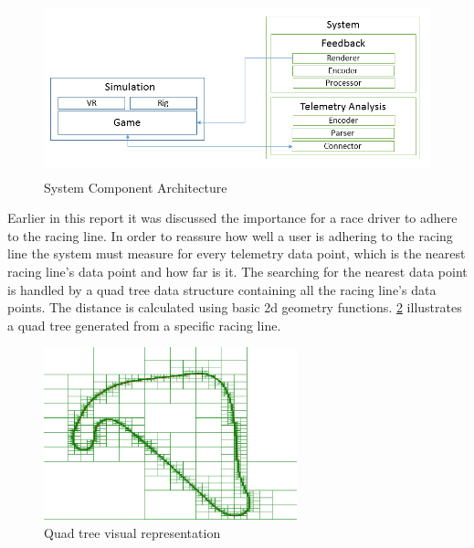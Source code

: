\documentclass{article}
\begin{document}
\begin{figure}[!htb]
	\centering
	\includegraphics[height=5cm]{SystemArc}
	\caption{System Component Architecture}
	\label{fig:SystemComponentArchitecture}
\end{figure}

Earlier in this report it was discussed the importance for a race driver to adhere to the racing line. In order to reassure how well a user is adhering to the racing line the system must measure for every telemetry data point, which is the nearest racing line's data point and how far is it. The searching for the nearest data point is handled by a quad tree data structure containing all the racing line's data points. The distance is calculated using basic 2d geometry functions. \ref{fig:QuadTree} illustrates a quad tree generated from a specific racing line. 

\begin{figure}[!htb]
	\centering
	\includegraphics[height=5cm]{QuadTree}
	\caption{Quad tree visual representation}
	\label{fig:QuadTree}
\end{figure}
\end{document}

